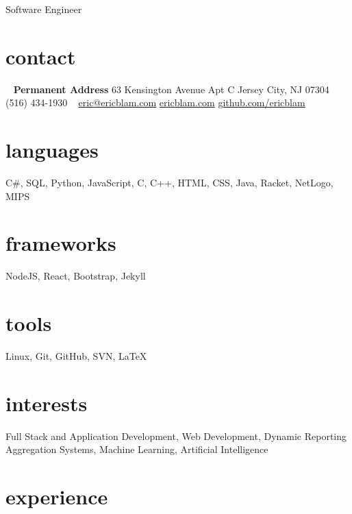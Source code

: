 \documentclass[]{friggeri-cv}
\begin{document}
       {Software Engineer}

\begin{aside}
  \section{contact}
    ~
    \textbf{Permanent Address}
    63 Kensington Avenue
    Apt C
    Jersey City, NJ 07304
    ~
    (516) 434-1930
    ~
    \href{mailto:eric@ericblam.com}{eric@ericblam.com}
    \href{http://ericblam.com}{ericblam.com}
    \href{http://github.com/ericblam}{github.com/ericblam}
  \section{languages}
    C\#, SQL, Python, JavaScript, C, C++, HTML, CSS, Java, Racket, NetLogo, MIPS
  \section{frameworks}
    NodeJS, React, Bootstrap, Jekyll
  \section{tools}
    Linux, Git, GitHub, SVN, \LaTeX
\end{aside}

\section{interests}

Full Stack and Application Development, Web Development, Dynamic Reporting Aggregation Systems, Machine Learning, Artificial Intelligence

\section{experience}
\end{document}
